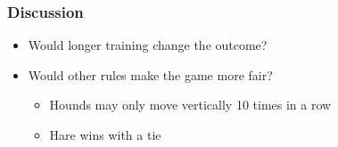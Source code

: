 \documentclass{beamer}
\begin{document}

\begin{frame}
	\frametitle{Discussion}
	\begin{itemize}
		\item Would longer training change the outcome?
		\item Would other rules make the game more fair?
		\begin{itemize}[<+->]
        		\item<2-> Hounds may only move vertically 10 times in a row
	 		\item<3-> Hare wins with a tie
		\end{itemize}
	\end{itemize}
\end{frame}
\end{document}
